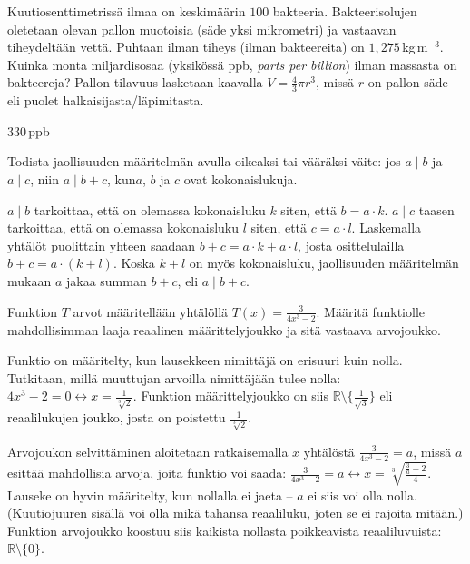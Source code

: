 \begin{tehtava}
Kuutiosenttimetrissä ilmaa on keskimäärin $100$ bakteeria. Bakteerisolujen oletetaan olevan pallon muotoisia (säde yksi mikrometri) ja vastaavan tiheydeltään vettä. Puhtaan ilman tiheys (ilman bakteereita) on $1,275$\,kg\,m$^{-3}$. Kuinka monta miljardisosaa (yksikössä ppb, \textit{parts per billion}) ilman massasta on bakteereja? Pallon tilavuus lasketaan kaavalla $V=\frac{4}{3}\pi r^3$, missä $r$ on pallon säde eli puolet halkaisijasta/läpimitasta.
	\begin{vastaus}
	$330$\,ppb %
	\end{vastaus}
\end{tehtava}	
	
\begin{tehtava}
Todista jaollisuuden määritelmän avulla oikeaksi tai vääräksi väite: jos $a\mid b$ ja $a\mid c$, niin $a\mid b+c$, kun$a$, $b$ ja $c$ ovat kokonaislukuja.
	\begin{vastaus}
	$a	\mid b$ tarkoittaa, että on olemassa kokonaisluku $k$ siten, että $b=a\cdot k$. $a \mid c$ taasen tarkoittaa, että on olemassa kokonaisluku $l$ siten, että $c=a\cdot l$. Laskemalla yhtälöt puolittain yhteen saadaan $b+c=a\cdot k + a\cdot l$, josta osittelulailla $b+c=a\cdot (k+l)$. Koska $k+l$ on myös kokonaisluku, jaollisuuden määritelmän mukaan $a$ jakaa summan $b+c$, eli $a\mid b+c$.
	\end{vastaus}
\end{tehtava}	
	
\begin{tehtava}
Funktion $T$ arvot määritellään yhtälöllä $T(x)=\frac{3}{4x^3-2}$. Määritä funktiolle mahdollisimman laaja reaalinen määrittelyjoukko ja sitä vastaava arvojoukko.
	\begin{vastaus}
Funktio on määritelty, kun lausekkeen nimittäjä on erisuuri kuin nolla. Tutkitaan, millä muuttujan arvoilla nimittäjään tulee nolla: $4x^3-2=0 \leftrightarrow x=\frac{1}{\sqrt[3]{2}}$. Funktion määrittelyjoukko on siis $\mathbb{R}\setminus\lbrace\frac{1}{\sqrt{3}} \rbrace$ eli reaalilukujen joukko, josta on poistettu $\frac{1}{\sqrt[3]{2}}$.

Arvojoukon selvittäminen aloitetaan ratkaisemalla $x$ yhtälöstä $\frac{3}{4x^3-2}=a$, missä $a$ esittää mahdollisia arvoja, joita funktio voi saada: $\frac{3}{4x^3-2}=a \leftrightarrow x= \sqrt[3]{\frac{\frac{3}{a}+2}{4}}$. Lauseke on hyvin määritelty, kun nollalla ei jaeta -- $a$ ei siis voi olla nolla. (Kuutiojuuren sisällä voi olla mikä tahansa reaaliluku, joten se ei rajoita mitään.) Funktion arvojoukko koostuu siis kaikista nollasta poikkeavista reaaliluvuista: $\mathbb{R}\setminus \lbrace 0 \rbrace$.
	\end{vastaus}
\end{tehtava}


